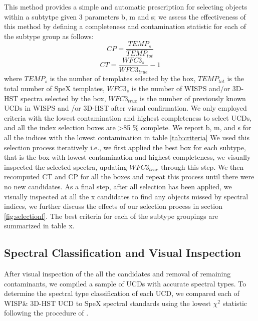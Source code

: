 \documentclass[manuscript]{aastex}
\begin{document}
This method provides a simple and automatic prescription for selecting objects  within a subtytpe given 3 parameters b, m and s; we assess the effectiveness of this method by defining a completeness and contamination statistic for each of the subtype group  as follows: 
 \begin{equation} CP=\frac{TEMP_s}{TEMP_{tot}} \end{equation}
\begin{equation} CT= \frac{WFC3_s}{WFC3_{true}} -1 \end{equation} where $TEMP_s$ is the number of templates selected by the box, $TEMP_{tot}$ is the total number of SpeX templates, $WFC3_s$ is the number of WISPS and/or 3D-HST spectra selected by the box, $WFC3_{true}$  is the number of previously known UCDs in WISPS and /or 3D-HST after visual confirmation. We only employed criteria with the lowest contamination and highest completeness to select UCDs, and all the index selection boxes are \textgreater85 \% complete.  We report b, m, and s for all the indices with the lowest contamination in table \ref{tab:criteria}
We used this selection process iteratively i.e., we first applied the best box for each subtype, that is the box with lowest contamination and highest completeness, we visually inspected the selected spectra, updating $WFC3_{true}$ through this step. We then recomputed CT and CP for all the boxes and repeat this process until there were no new candidates. As a final step, after all selection has been applied, we visually inspected at all the x candidates to find any objects missed by spectral indices, we further discuss the effects of our selection process in section \ref{fig:selectionf}. The best criteria for each of the subtype groupings are summarized in table x.

\subsection{Spectral Classification and Visual Inspection} \label{visual}

After visual inspection of the all the candidates and removal of remaining contaminants, we compiled a sample of UCDs with accurate spectral types. To determine the spectral type classification of each UCD, we compared each of WISP\& 3D-HST UCD to SpeX spectral standards using the lowest $\chi^2$ statistic following the procedure of \cite{2010ApJS..190..100K}. 
\end{document}
